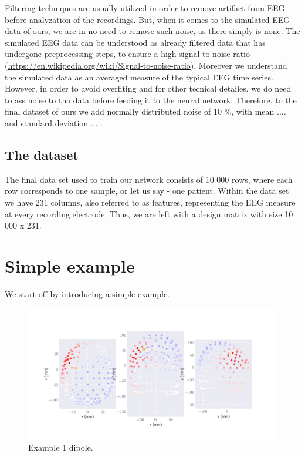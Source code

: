 \documentclass[a4paper, UKenglish, 11pt]{uiomaster}
\begin{document}
Filtering techniques are usually utilized in order to remove artifact from EEG before analyzation of the recordings. But, when it comes to the simulated EEG data of ours, we are in no need to remove such noise, as there simply is none. The simulated EEG data can be understood as already filtered data that has undergone preprocessing steps, to ensure a high signal-to-noise ratio (\url{https://en.wikipedia.org/wiki/Signal-to-noise-ratio}). Moreover we understand the simulated data as an averaged measure of the typical EEG time series. However, in order to avoid overfiting and for other tecnical detailes, we do need to ass noise to tha data before feeding it to the neural network. Therefore, to the final dataset of ours we add normally distributed noise of 10 $\%$, with mean .... and standard deviation ... .



\subsection{The dataset}
The final data set used to train our network consists of 10 000 rows, where each row corresponds to one sample, or let us say - one patient. Within the data set we have 231 columns, also referred to as features, representing the EEG measure at every recording electrode. Thus, we are left with a design matrix with size 10 000 x 231.


\section{Simple example}
We start off by introducing a simple example.

\begin{figure}[!htb]
    \centering
    \includegraphics[width=\linewidth]{../Code/plots/finals/eeg_field_1_1.png}
    \caption{Example 1 dipole. }
    \label{fig:eeg_field_1_dipole_example}
\end{figure}
\end{document}
